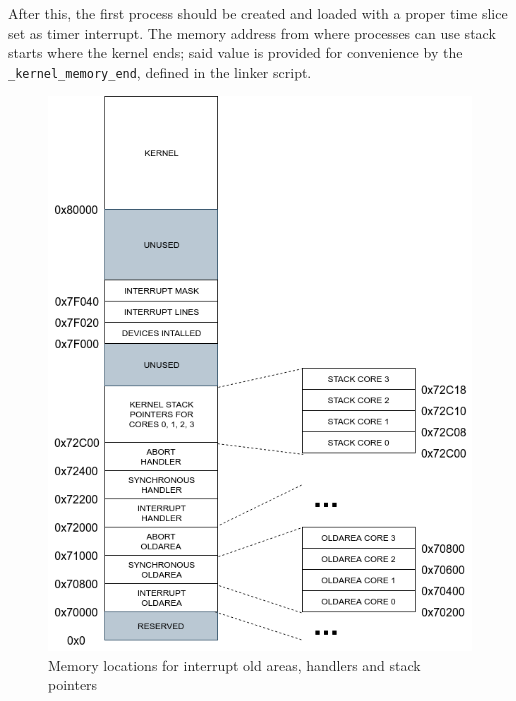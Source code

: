 \documentclass[12pt,a4paper,openright,twoside]{report}
\begin{document}
After this, the first process should be created and loaded with a proper time
slice set as timer interrupt. The memory address from where processes can use 
stack starts where the kernel ends; said value is provided for convenience by 
the {\tt \_kernel\_memory\_end}, defined in the linker script.

 \begin{figure}[h]
    \begin{center}
 \includegraphics[scale=0.55]{images/tesi14.png}
 \caption[Memory Map]{Memory locations for interrupt old areas, handlers 
 and stack pointers}\label{fig:memmap}
    \end{center}
 \end{figure}

 \newpage
\end{document}
